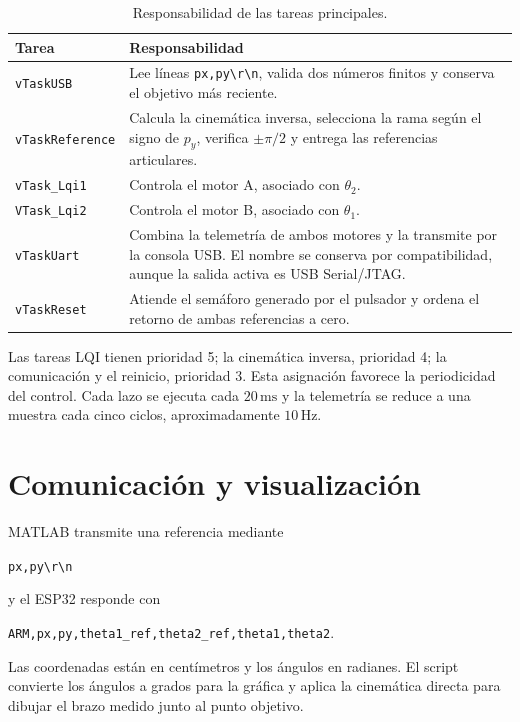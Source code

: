 \documentclass[11pt,a4paper]{article}
\begin{document}
\begin{table}[H]
\centering
\caption{Responsabilidad de las tareas principales.}
\begin{tabular}{p{3.2cm}p{9.9cm}}
\toprule
\textbf{Tarea} & \textbf{Responsabilidad} \\
\midrule
\texttt{vTaskUSB} & Lee líneas \texttt{px,py\textbackslash r\textbackslash n}, valida dos números finitos y conserva el objetivo más reciente. \\
\texttt{vTaskReference} & Calcula la cinemática inversa, selecciona la rama según el signo de $p_y$, verifica $\pm\pi/2$ y entrega las referencias articulares. \\
\texttt{vTask\_Lqi1} & Controla el motor A, asociado con $\theta_2$. \\
\texttt{VTask\_Lqi2} & Controla el motor B, asociado con $\theta_1$. \\
\texttt{vTaskUart} & Combina la telemetría de ambos motores y la transmite por la consola USB. El nombre se conserva por compatibilidad, aunque la salida activa es USB Serial/JTAG. \\
\texttt{vTaskReset} & Atiende el semáforo generado por el pulsador y ordena el retorno de ambas referencias a cero. \\
\bottomrule
\end{tabular}
\end{table}

Las tareas LQI tienen prioridad 5; la cinemática inversa, prioridad 4; la comunicación y el reinicio, prioridad 3. Esta asignación favorece la periodicidad del control. Cada lazo se ejecuta cada $20\,\mathrm{ms}$ y la telemetría se reduce a una muestra cada cinco ciclos, aproximadamente $10\,\mathrm{Hz}$.

\section{Comunicación y visualización}

MATLAB transmite una referencia mediante

\begin{center}
\texttt{px,py\textbackslash r\textbackslash n}
\end{center}

y el ESP32 responde con

\begin{center}
\texttt{ARM,px,py,theta1\_ref,theta2\_ref,theta1,theta2}.
\end{center}

Las coordenadas están en centímetros y los ángulos en radianes. El script convierte los ángulos a grados para la gráfica y aplica la cinemática directa para dibujar el brazo medido junto al punto objetivo.
\end{document}
